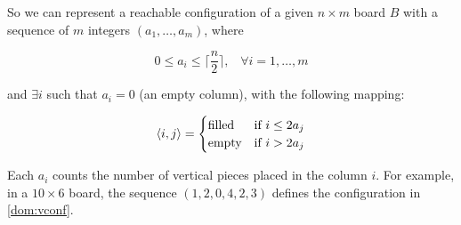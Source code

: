 So we can represent a reachable configuration of a given $n \times m$ board $B$ with a sequence of $m$ integers $(a_1, \dots, a_m)$, where

$$0 \leq a_i \leq \lceil \frac{n}{2} \rceil, \;\;\;   \forall i = 1,\dots, m$$

and $\exists i$ such that $a_i = 0$ (an empty column), with the following mapping: 

$$
\cell = \begin{cases}
   \text{filled}  & \text{if } i \leq  2a_j  \\
   \text{empty}   & \text{if } i >  2a_j
\end{cases}
$$

Each $a_i$ counts the number of vertical pieces placed in the column $i$. For example, in a $10 \times 6 $  board, the sequence $(1,2,0,4,2,3)$ defines the configuration in 
\ref{dom:vconf}.

